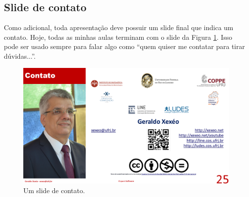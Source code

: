 \subsection{Slide de contato}

Como adicional, toda apresentação deve possuir um slide final que indica um contato. Hoje, todas as minhas aulas terminam com o slide da Figura \ref{fig:fim}. Isso pode ser usado sempre para falar algo como ``quem quiser me contatar para tirar dúvidas...''.

\begin{figure}[h]
    \centering
    \includegraphics[width=\tam\linewidth]{imagens/fim.png}
    \caption{Um slide de contato.}
    \label{fig:fim}
\end{figure}



